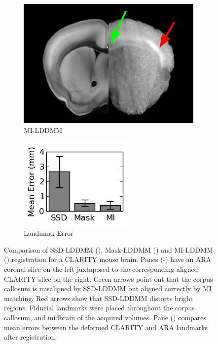 \documentclass[simplex.tex]{subfiles}
\begin{document}
\begin{figure}[!h]
\begin{cframed}
\begin{subfigure}{0.25\columnwidth}
  \includegraphics[width=\textwidth]{../../figs/miCoronal.png}  
  \caption{MI-LDDMM}
  \label{fig:clarityCoronalMI}
 \end{subfigure}
 \begin{subfigure}{0.2\columnwidth}
  \includegraphics[width=\textwidth]{../../figs/lmkError.png}  
  \caption{Landmark Error}
  \label{fig:lmkError}
 \end{subfigure}
 \caption{Comparison of SSD-LDDMM (), Mask-LDDMM () and MI-LDDMM () registration for a CLARITY mouse brain.
  Panes (-) have an ARA coronal slice on the left juxtaposed to the corresponding aligned CLARITY slice on the right.
  Green arrows point out that the corpus callosum is misaligned by SSD-LDDMM but aligned correctly by MI matching.
  Red arrows show that SSD-LDDMM distorts bright regions.
  Fiducial landmarks were placed throughout the corpus callosum, and midbrain of the acquired volumes.
  Pane () compares mean errors between the deformed CLARITY and ARA landmarks after registration.
 }
 \label{fig:comparison}
\end{cframed}
\end{figure}
\end{document}
